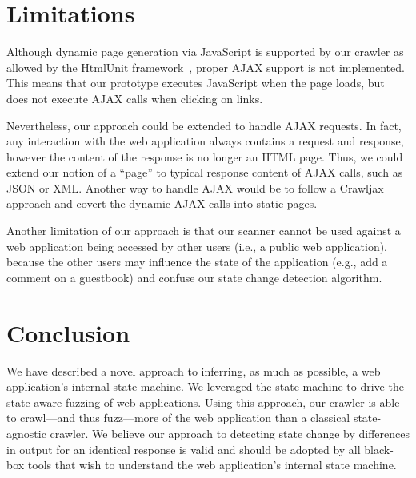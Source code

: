 

\section{Limitations}

Although dynamic page generation via JavaScript is supported by our crawler as allowed by the HtmlUnit
framework~\cite{htmlunit}, proper AJAX support is not implemented. This means that our prototype
executes JavaScript when the page loads, but does not execute AJAX calls when
clicking on links.

Nevertheless, our approach could be extended to handle AJAX requests. In fact,
any interaction with the web application always contains a request and
response, however the content of the response is no longer an HTML page. Thus,
we could extend our notion of a ``page'' to typical response content of AJAX
calls, such as JSON or XML. Another way to handle AJAX would be to follow a
Crawljax~\cite{mesbah09:crawljax} approach and covert the dynamic AJAX calls
into static pages.

Another limitation of our approach is that our scanner cannot be used against a
web application being accessed by other users (i.e., a public web application), because
the other users may influence the state of the application (e.g., add a comment
on a guestbook) and confuse our state change detection algorithm. 


\section{Conclusion}

We have described a novel approach to inferring, as much as possible, a web
application's internal state machine. We leveraged the state machine to drive the
state-aware fuzzing of web applications. Using this approach, our crawler is
able to crawl---and thus fuzz---more of the web application than a classical
state-agnostic crawler. We believe our approach to detecting state change by
differences in output for an identical response is valid and should be adopted by
all black-box tools that wish to understand the web application's
internal state machine.




